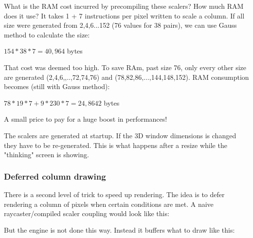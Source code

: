 \par
What is the RAM cost incurred by precompiling these scalers? How much RAM does it use? It takes 1 + 7 instructions per pixel written to scale a column. If all size were generated from 2,4,6...152 (76 values for 38 pairs), we can use Gauss method to calculate the size:\\
\par
$154*38*7=40,964$ bytes\\
\par
That cost was deemed too high. To save RAm, past size 76, only every other size are generated (2,4,6,,..,72,74,76) and (78,82,86,...,144,148,152). RAM consumption becomes (still with Gauss method):\\
\par
$78*19*7+9*230*7=24,8642$ bytes\\
\par
A small price to pay for a huge boost in performances!\\
\par
The scalers are generated at startup. If the 3D window dimensions is changed they have to be re-generated. This is what happens after a resize while the "thinking" screen is showing.
\begin{figure}[H]
 \centering
\end{figure}








\subsubsection{Deferred column drawing}
There is a second level of trick to speed up rendering. The idea is to defer rendering a column of pixels when certain conditions are met. A naive raycaster/compiled scaler coupling would look like this:\\

\begin{minipage}{\textwidth}

\end{minipage}
\par
But the engine is not done this way. Instead it buffers what to draw like this:\\
\par
\begin{minipage}{\textwidth}

\end{minipage}

